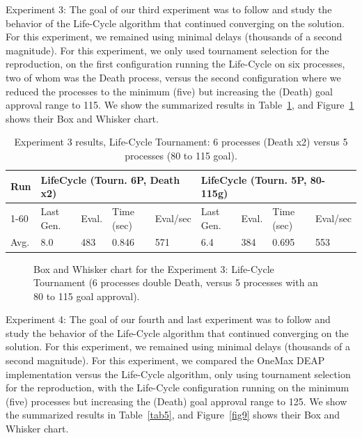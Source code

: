 \documentclass[runningheads]{llncs}
\begin{document}
Experiment 3: The goal of our third experiment was to follow and study the
behavior of the Life-Cycle algorithm that continued converging on the solution.
For this experiment, we remained using minimal delays (thousands of a second
magnitude). For this experiment, we only used tournament selection for the
reproduction, on the first configuration running the Life-Cycle on six
processes, two of whom was the Death process, versus the second configuration
where we reduced the processes to the minimum (five) but increasing the (Death)
goal approval range to 115. We show the summarized results in Table~\ref{tab4},
and Figure~\ref{fig8} shows their Box and Whisker chart.

\begin{table}[]
    \centering        
    \caption{Experiment 3 results, Life-Cycle Tournament: 6 processes (Death x2) versus 5 processes (80 to 115 goal).}\label{tab4}
    \begin{tabular}{|l|l|l|l|l|l|l|l|l|}
    \hline
    Run & \multicolumn{4}{l|}{LifeCycle (Tourn. 6P, Death x2)} & \multicolumn{4}{l|}{LifeCycle (Tourn. 5P, 80-115g)} \\ \hline
    1-60 & Last Gen. & Eval. & Time (sec) & Eval/sec & Last Gen. & Eval. & Time (sec) & Eval/sec \\ \hline
    Avg. & 8.0 & 483 & 0.846 & 571 & 6.4 & 384 & 0.695 & 553 \\ \hline
    \end{tabular}
    \end{table}

\begin{figure}
    \caption{Box and Whisker chart for the Experiment 3: Life-Cycle Tournament (6 processes double Death, versus 5 processes with an 80 to 115 goal approval).} \label{fig8}
    \end{figure}


Experiment 4: The goal of our fourth and last experiment was to follow and
study the behavior of the Life-Cycle algorithm that continued converging on the
solution. For this experiment, we remained using minimal delays (thousands of a
second magnitude). For this experiment, we compared the OneMax DEAP
implementation versus the Life-Cycle algorithm, only using tournament selection
for the reproduction, with the Life-Cycle configuration running on the minimum
(five) processes but increasing the (Death) goal approval range to 125. We show
the summarized results in Table~\ref{tab5}, and Figure~\ref{fig9} shows their Box and Whisker
chart.
\end{document}
